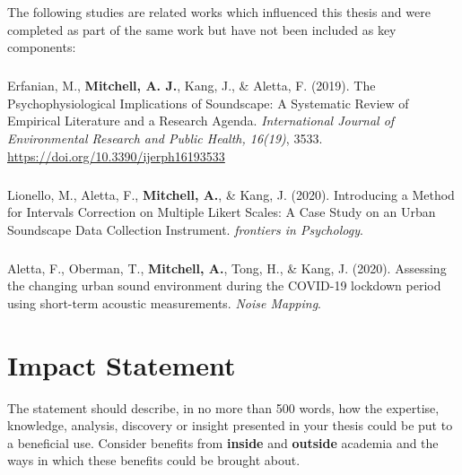 \documentclass[oneside,fontsize=12pt,titlepage]{scrbook}
\begin{document}

\newpage
The following studies are related works which influenced this thesis and were completed as part of the same work but have not been included as key components:

\paragraph*{}Erfanian, M., \textbf{Mitchell, A. J.}, Kang, J., \& Aletta, F. (2019). The Psychophysiological Implications of Soundscape: A Systematic Review of Empirical Literature and a Research Agenda. \emph{International Journal of Environmental Research and Public Health, 16(19)}, 3533. \url{https://doi.org/10.3390/ijerph16193533}

\paragraph*{}Lionello, M., Aletta, F., \textbf{Mitchell, A.}, \& Kang, J. (2020). Introducing a Method for Intervals Correction on Multiple Likert Scales: A Case Study on an Urban Soundscape Data Collection Instrument. \emph{frontiers in Psychology}.

\paragraph*{}Aletta, F., Oberman, T., \textbf{Mitchell, A.}, Tong, H., \& Kang, J. (2020). Assessing the changing urban sound environment during the COVID-19 lockdown period using short-term acoustic measurements. \emph{Noise Mapping}.




\chapter*{Impact Statement}
The statement should describe, in no more than 500 words, how the expertise, knowledge, analysis, discovery or insight presented in your thesis could be put to a beneficial use. Consider benefits from \textbf{inside} and \textbf{outside} academia and the ways in which these benefits could be brought about.
\end{document}
